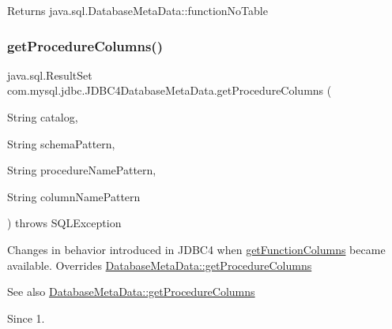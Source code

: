 \begin{DoxyReturn}{Returns}
java.\+sql.\+Database\+Meta\+Data\+::function\+No\+Table 
\end{DoxyReturn}
\mbox{\label{classcom_1_1mysql_1_1jdbc_1_1_j_d_b_c4_database_meta_data_ad0a1ffad3aaa5a817317e482b5c26125}} 
\subsubsection{\texorpdfstring{get\+Procedure\+Columns()}{getProcedureColumns()}}
{\footnotesize\ttfamily java.\+sql.\+Result\+Set com.\+mysql.\+jdbc.\+J\+D\+B\+C4\+Database\+Meta\+Data.\+get\+Procedure\+Columns (\begin{DoxyParamCaption}\item[{String}]{catalog,  }\item[{String}]{schema\+Pattern,  }\item[{String}]{procedure\+Name\+Pattern,  }\item[{String}]{column\+Name\+Pattern }\end{DoxyParamCaption}) throws S\+Q\+L\+Exception}

Changes in behavior introduced in J\+D\+B\+C4 when \mbox{\hyperlink{classcom_1_1mysql_1_1jdbc_1_1_database_meta_data_ac3dfe62ad76ecff89524d11761f24a11}{get\+Function\+Columns}} became available. Overrides \mbox{\hyperlink{classcom_1_1mysql_1_1jdbc_1_1_database_meta_data_ae2d34b7a6ae33efa59382465aaa01f58}{Database\+Meta\+Data\+::get\+Procedure\+Columns}}

\begin{DoxySeeAlso}{See also}
\mbox{\hyperlink{classcom_1_1mysql_1_1jdbc_1_1_database_meta_data_ae2d34b7a6ae33efa59382465aaa01f58}{Database\+Meta\+Data\+::get\+Procedure\+Columns}} 
\end{DoxySeeAlso}
\begin{DoxySince}{Since}
1. 
\end{DoxySince}
\mbox{\label{classcom_1_1mysql_1_1jdbc_1_1_j_d_b_c4_database_meta_data_a2792991e9a30eabf05de200840c80a42}} 
